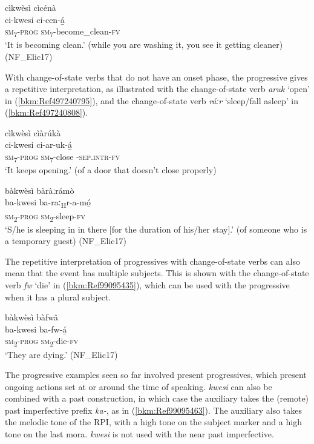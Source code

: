 \ea
\label{bkm:Ref497242247}
cìkwèsì cìcénà\\
\gll ci-kwesi  ci-cen-á̲\\
\textsc{sm}\textsubscript{7}-\textsc{prog}  \textsc{sm}\textsubscript{7}-become\_clean-\textsc{fv}\\
\glt ‘It is becoming clean.’ (while you are washing it, you see it getting cleaner) (NF\_Elic17)
\z

With change-of-state verbs that do not have an onset phase, the progressive gives a repetitive interpretation, as illustrated with the change-of-state verb \textit{aruk} ‘open’ in (\ref{bkm:Ref497240795}), and the change-of-state verb \textit{ráːr} ‘sleep/fall asleep’ in (\ref{bkm:Ref497240808}).

\ea
\label{bkm:Ref497240795}
cìkwèsì cìàrúkà\\
\gll ci-kwesi  ci-ar-uk-á̲\\
\textsc{sm}\textsubscript{7}-\textsc{prog}  \textsc{sm}\textsubscript{7}-close -\textsc{sep}.\textsc{intr}-\textsc{fv}\\
\glt ‘It keeps opening.’ (of a door that doesn’t close properly)
\z

\ea
\label{bkm:Ref497240808}
bàkwèsì bàràːrámò\\
\gll ba-kwesi  ba-raː\textsubscript{H}r-a-mó̲\\
\textsc{sm}\textsubscript{2}-\textsc{prog}  \textsc{sm}\textsubscript{2}-sleep-\textsc{fv}\\
\glt ‘S/he is sleeping in in there [for the duration of his/her stay].’ (of someone who is a temporary guest) (NF\_Elic17)
\z

The repetitive interpretation of progressives with change-of-state verbs can also mean that the event has multiple subjects. This is shown with the change-of-state verb \textit{fw} ‘die’ in (\ref{bkm:Ref99095435}), which can be used with the progressive when it has a plural subject.

\ea
\label{bkm:Ref99095435}
bàkwèsì bàfwâ\\
\gll ba-kwesi  ba-fw-á̲\\
\textsc{sm}\textsubscript{2}-\textsc{prog}  \textsc{sm}\textsubscript{2}-die-\textsc{fv}\\
\glt ‘They are dying.’ (NF\_Elic17)
\z

The progressive examples seen so far involved present progressives, which present ongoing actions set at or around the time of speaking. \textit{kwesi} can also be combined with a past construction, in which case the auxiliary takes the (remote) past imperfective prefix \textit{ka-}, as in (\ref{bkm:Ref99095463}). The auxiliary also takes the melodic tone of the RPI, with a high tone on the subject marker and a high tone on the last mora. \textit{kwesi} is not used with the near past imperfective.

